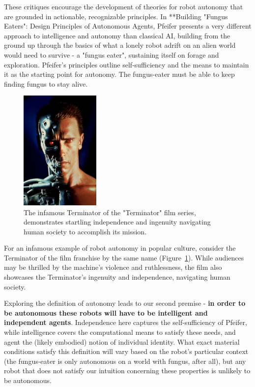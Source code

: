 \documentclass{sfuthesis}
\begin{document}

These critiques encourage the development of theories for robot autonomy that are grounded in actionable, recognizable principles. In **Building "Fungus Eaters": Design Principles of Autonomous Agents, Pfeifer presents a very different approach to intelligence and autonomy than classical AI, building from the ground up through the basics of what a lonely robot adrift on an alien world would need to survive - a "fungus eater", sustaining itself on forage and exploration. Pfeifer's principles outline self-sufficiency and the means to maintain it as the starting point for autonomy. The fungus-eater must be able to keep finding fungus to stay alive.

\begin{figure}
    \centering
    \includegraphics[width=0.35\textwidth]{terminator.png} 

    \caption{The infamous Terminator of the "Terminator" film series, demonstrates startling independence and ingenuity navigating human society to accomplish its mission.}
    \label{fig:terminator}
\end{figure}

For an infamous example of robot autonomy in popular culture, consider the Terminator of the film franchise by the same name (Figure~\ref{fig:terminator}). While audiences may be thrilled by the machine's violence and ruthlessness, the film also showcases the Terminator's ingenuity and independence, navigating human society.

Exploring the definition of autonomy leads to our second premise - \textbf{in order to be autonomous these robots will have to be intelligent and independent agents}. Independence here captures the self-sufficiency of Pfeifer, while intelligence covers the computational means to satisfy these needs, and agent the (likely embodied) notion of individual identity. What exact material conditions satisfy this definition will vary based on the robot's particular context (the fungus-eater is only autonomous on a world with fungus, after all), but any robot that does not satisfy our intuition concerning these properties is unlikely to be autonomous.
\end{document}

